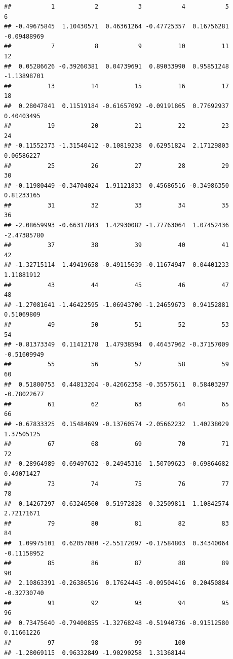 \documentclass[
]{book}
\begin{document}
\begin{verbatim}
##           1           2           3           4           5           6 
## -0.49675845  1.10430571  0.46361264 -0.47725357  0.16756281 -0.09488969 
##           7           8           9          10          11          12 
##  0.05286626 -0.39260381  0.04739691  0.89033990  0.95851248 -1.13898701 
##          13          14          15          16          17          18 
##  0.28047841  0.11519184 -0.61657092 -0.09191865  0.77692937  0.40403495 
##          19          20          21          22          23          24 
## -0.11552373 -1.31540412 -0.10819238  0.62951824  2.17129803  0.06586227 
##          25          26          27          28          29          30 
## -0.11980449 -0.34704024  1.91121833  0.45686516 -0.34986350  0.81233165 
##          31          32          33          34          35          36 
## -2.08659993 -0.66317843  1.42930082 -1.77763064  1.07452436 -2.47385780 
##          37          38          39          40          41          42 
## -1.32715114  1.49419658 -0.49115639 -0.11674947  0.04401233  1.11881912 
##          43          44          45          46          47          48 
## -1.27081641 -1.46422595 -1.06943700 -1.24659673  0.94152881  0.51069809 
##          49          50          51          52          53          54 
## -0.81373349  0.11412178  1.47938594  0.46437962 -0.37157009 -0.51609949 
##          55          56          57          58          59          60 
##  0.51800753  0.44813204 -0.42662358 -0.35575611  0.58403297 -0.78022677 
##          61          62          63          64          65          66 
## -0.67833325  0.15484699 -0.13760574 -2.05662232  1.40238029  1.37505125 
##          67          68          69          70          71          72 
## -0.28964989  0.69497632 -0.24945316  1.50709623 -0.69864682  0.49071427 
##          73          74          75          76          77          78 
##  0.14267297 -0.63246560 -0.51972828 -0.32509811  1.10842574  2.72171671 
##          79          80          81          82          83          84 
##  1.09975101  0.62057080 -2.55172097 -0.17584803  0.34340064 -0.11158952 
##          85          86          87          88          89          90 
##  2.10863391 -0.26386516  0.17624445 -0.09504416  0.20450884 -0.32730740 
##          91          92          93          94          95          96 
##  0.73475640 -0.79400855 -1.32768248 -0.51940736 -0.91512580  0.11661226 
##          97          98          99         100 
## -1.28069115  0.96332849 -1.90290258  1.31368144
\end{verbatim}
\end{document}
